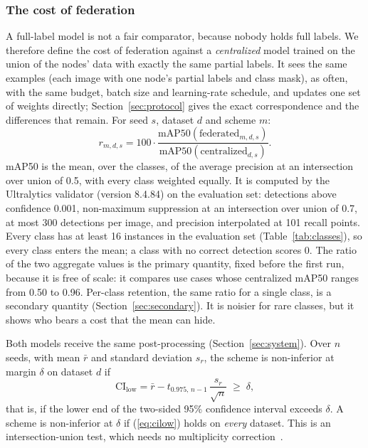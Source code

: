 \documentclass[pdflatex,sn-mathphys-num]{sn-jnl}
\begin{document}
\subsubsection{The cost of federation}
A full-label model is not a fair comparator, because nobody holds full labels. We therefore define the cost of federation against a \emph{centralized} model trained on the union of the nodes' data with exactly the same partial labels. It sees the same examples (each image with one node's partial labels and class mask), as often, with the same budget, batch size and learning-rate schedule, and updates one set of weights directly; Section~\ref{sec:protocol} gives the exact correspondence and the differences that remain. For seed $s$, dataset $d$ and scheme $m$:
\begin{equation}
r_{m,d,s} = 100\cdot\frac{\mathrm{mAP50}(\text{federated}_{m,d,s})}{\mathrm{mAP50}(\text{centralized}_{d,s})}.\label{eq:ratio}
\end{equation}
mAP50 is the mean, over the classes, of the average precision at an intersection over union of 0.5, with every class weighted equally. It is computed by the Ultralytics validator (version 8.4.84) on the evaluation set: detections above confidence 0.001, non-maximum suppression at an intersection over union of 0.7, at most 300 detections per image, and precision interpolated at 101 recall points. Every class has at least 16 instances in the evaluation set (Table~\ref{tab:classes}), so every class enters the mean; a class with no correct detection scores 0. The ratio of the two aggregate values is the primary quantity, fixed before the first run, because it is free of scale: it compares use cases whose centralized mAP50 ranges from 0.50 to 0.96. Per-class retention, the same ratio for a single class, is a secondary quantity (Section~\ref{sec:secondary}). It is noisier for rare classes, but it shows who bears a cost that the mean can hide.

Both models receive the same post-processing (Section~\ref{sec:system}). Over $n$ seeds, with mean $\bar r$ and standard deviation $s_r$, the scheme is non-inferior at margin $\delta$ on dataset $d$ if
\begin{equation}
\mathrm{CI}_{\text{low}} = \bar r - t_{0.975,\,n-1}\,\frac{s_r}{\sqrt n}\;\ge\;\delta, \label{eq:cilow}
\end{equation}
that is, if the lower end of the two-sided 95\% confidence interval exceeds $\delta$. A scheme is non-inferior at $\delta$ if (\ref{eq:cilow}) holds on \emph{every} dataset. This is an intersection-union test, which needs no multiplicity correction~\cite{berger1996iut}.
\end{document}
